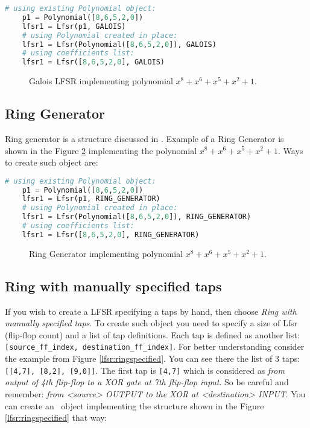 \begin{lstlisting}[language=Python]
	# using existing Polynomial object:
	p1 = Polynomial([8,6,5,2,0])
	lfsr1 = Lfsr(p1, GALOIS)
	# using Polynomial created in place:
	lfsr1 = Lfsr(Polynomial([8,6,5,2,0]), GALOIS)
	# using coefficients list:
	lfsr1 = Lfsr([8,6,5,2,0], GALOIS)
\end{lstlisting}

\begin{figure}[h]
	\centering
	\scalebox{.75}{}
	\caption{Galois LFSR implementing polynomial $x^8+x^6+x^5+x^2+1$.}
	\label{lfsr:galois}
\end{figure}

\subsection{Ring Generator}


Ring generator is a structure discussed in \cite{lfsr:fastsim}. Example of a Ring Generator is shown in the Figure \ref{lfsr:ring} implementing the polynomial $x^8+x^6+x^5+x^2+1$. Ways to create such object are:

\begin{lstlisting}[language=Python]
	# using existing Polynomial object:
	p1 = Polynomial([8,6,5,2,0])
	lfsr1 = Lfsr(p1, RING_GENERATOR)
	# using Polynomial created in place:
	lfsr1 = Lfsr(Polynomial([8,6,5,2,0]), RING_GENERATOR)
	# using coefficients list:
	lfsr1 = Lfsr([8,6,5,2,0], RING_GENERATOR)
\end{lstlisting}

\begin{figure}[h]
	\centering
	\scalebox{.75}{}
	\caption{Ring Generator implementing polynomial $x^8+x^6+x^5+x^2+1$.}
	\label{lfsr:ring}
\end{figure}

\subsection{Ring with manually specified taps}


If you wish to create a LFSR specifying a taps by hand, then choose \textit{Ring with manually specified taps}. To create such object you need to specify a size of Lfsr (flip-flop count) and a list of tap definitions. Each tap is defined as another list: \texttt{[source\_ff\_index, destination\_ff\_index]}. For better understanding consider the example from Figure \ref{lfsr:ringspecified}. You can see there the list of 3 taps: \texttt{[[4,7], [8,2], [9,0]]}. The first tap is \texttt{[4,7]} which is considered as \textit{from output of 4th flip-flop to a XOR gate at 7th flip-flop input}. So be careful and remember: \textit{from <source> OUTPUT to the XOR at <destination> INPUT}. You can create an \Lfsr\ object implementing the structure shown in the Figure \ref{lfsr:ringspecified} that way:

